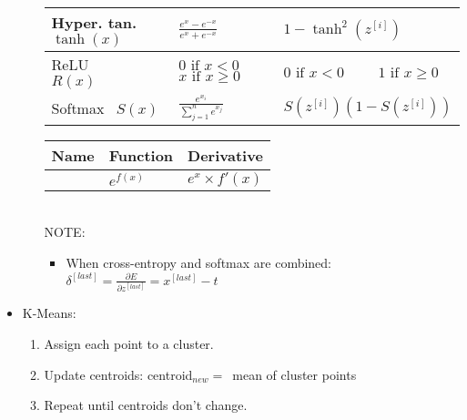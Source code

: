 \documentclass[twocolumn, 10pt]{article}
\begin{document}
\begin{itemize}[leftmargin=*, itemsep=0pt]
\begin{itemize}[topsep=0pt]
{\begin{tabular}{ | M{6em} | M{6em} | M{9em} | }
            Hyper. tan. $\tanh\left(x\right)$ & $\displaystyle \frac{e^x-e^{-x}}{e^x+e^{-x}}$ & $1-\tanh^2\left(z^{[i]}\right)$ \\\hline
            ReLU \ \ \ \ $R(x)$ & $0\mbox{ if }x<0$ $x\mbox{ if }x\geq 0$ & $0\mbox{ if }x<0$ \ \ \ \ $1\mbox{ if }x\geq 0$ \\\hline
            Softmax \ $S(x)$ & $\displaystyle \frac{e^{x_i}}{\sum_{j=1}^{n}e^{x_j}}$ & $S\left(z^{[i]}\right)\left(1-S\left(z^{[i]}\right)\right)$ \\\hline
        \end{tabular}}
        {\renewcommand{\arraystretch}{1.6}
        \begin{tabular}{ | M{6em} | M{6em} | M{9em} | } \hline
            Name & Function & Derivative \\\hline
            & $\displaystyle e^{f(x)}$ & $e^x\times f'(x)$ \\\hline
        \end{tabular}} \\[4pt]
        NOTE:
        \begin{itemize}
            \item When cross-entropy and softmax are combined: \\[2pt]
            $\displaystyle \delta^{[last]}=\frac{\partial E}{\partial z^{[last]}}=x^{[last]}-t$
        \end{itemize}
    \end{itemize}

    \item K-Means:
    \begin{enumerate}[topsep=0pt, itemsep=0pt]
        \item Assign each point to a cluster.
        \item Update centroids: centroid$_{new}=$\ mean of cluster points
        \item Repeat until centroids don't change.
    \end{enumerate}


\end{itemize}
\end{document}
